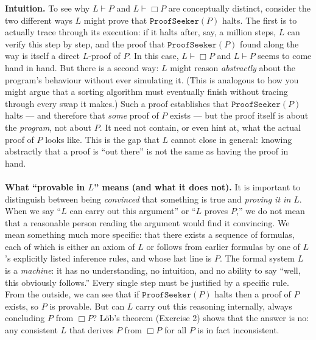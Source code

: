 \documentclass[8pt]{article}
\begin{document}
\medskip
\noindent
\textbf{Intuition.} To see why $L \vdash P$ and $L \vdash \Box P$ are conceptually
distinct, consider the two different ways $L$ might prove that
$\texttt{ProofSeeker}(P)$ halts. The first is to actually trace through its execution:
if it halts after, say, a million steps, $L$ can verify this step by step, and the proof
that $\texttt{ProofSeeker}(P)$ found along the way is itself a direct $L$-proof of $P$.
In this case, $L \vdash \Box P$ and $L \vdash P$ seems to come hand in hand. But there is a
second way: $L$ might reason \emph{abstractly} about the program's behaviour without
ever simulating it. (This is analogous to how you might argue that a sorting algorithm
must eventually finish without tracing through every swap it makes.) Such a proof
establishes that $\texttt{ProofSeeker}(P)$ halts --- and therefore that \emph{some}
proof of $P$ exists --- but the proof itself is about the \emph{program}, not about
$P$. It need not contain, or even hint at, what the actual proof of $P$ looks like.
This is the gap that $L$ cannot close in general: knowing abstractly that a proof is
``out there'' is not the same as having the proof in hand.\\\\



\medskip
\noindent
\textbf{What ``provable in $L$'' means (and what it does not).} It is
important to distinguish between being \emph{convinced} that something is true and
\emph{proving it in $L$}. When we say ``$L$ can carry out this argument'' or
``$L$ proves $P$,'' we do not mean that a reasonable person reading the argument
would find it convincing. We mean something much more specific: that there exists a
sequence of formulas, each of which is either an axiom of $L$ or follows from
earlier formulas by one of $L$'s explicitly listed inference rules, and whose last
line is $P$. The formal system $L$ is a \emph{machine}: it has no understanding, no
intuition, and no ability to say ``well, this obviously follows.'' Every single step
must be justified by a specific rule.\\

\noindent
From the outside, we can see that if $\texttt{ProofSeeker}(P)$ halts then a proof of $P$
exists, so $P$ is provable. But can $L$ carry out this reasoning internally, always concluding
$P$ from $\Box P$? L\"ob's theorem (Exercise 2) shows that the answer is no: any
consistent $L$ that derives $P$ from $\Box P$ for all $P$ is in fact inconsistent.
\end{document}
